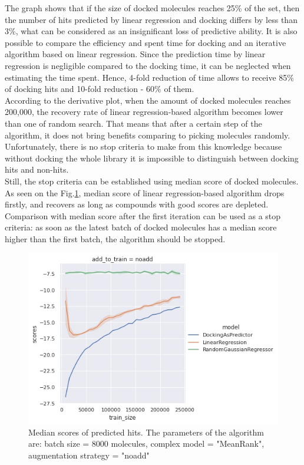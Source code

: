 The graph shows that if the size of docked molecules reaches 25\% of the set, then the number of hits predicted by linear regression and docking differs by less than 3\%, what can be considered as an insignificant loss of predictive ability.
It is also possible to compare the efficiency and spent time for docking and an iterative algorithm based on linear regression.
Since the prediction time by linear regression is negligible compared to the docking time, it can be neglected when estimating the time spent. 
Hence, 4-fold reduction of time allows to receive 85\% of docking hits and 10-fold reduction - 60\% of them.\\

According to the derivative plot, when the amount of docked molecules reaches 200,000, the recovery rate of linear regression-based algorithm becomes lower than one of random search.
That means that after a certain step of the algorithm, it does not bring benefits comparing to picking molecules randomly.
Unfortunately, there is no stop criteria to make from this knowledge because without docking the whole library it is impossible to distinguish between docking hits and non-hits.\\

Still, the stop criteria can be established using median score of docked molecules. 
As seen on the Fig.\ref{scores}, median score of linear regression-based algorithm drops firstly, and recovers as long as compounds with good scores are depleted. 
Comparison with median score after the first iteration can be used as a stop criteria: as soon as the latest batch of docked molecules has a median score higher than the first batch, the algorithm should be stopped.
\begin{figure}[H]
\centering
\includegraphics[width = 0.85\linewidth]{Images/4eiyScoresBest.jpg}
\caption{Median scores of predicted hits. The parameters of the algorithm are: batch size = 8000 molecules, complex model = "MeanRank", augmentation strategy = "noadd"}
\label{scores}
\end{figure}

